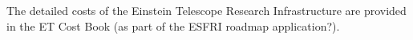 
\label{part:Costing}

The detailed costs of the Einstein Telescope Research Infrastructure are provided in the ET Cost Book (as part of the ESFRI roadmap application?).

